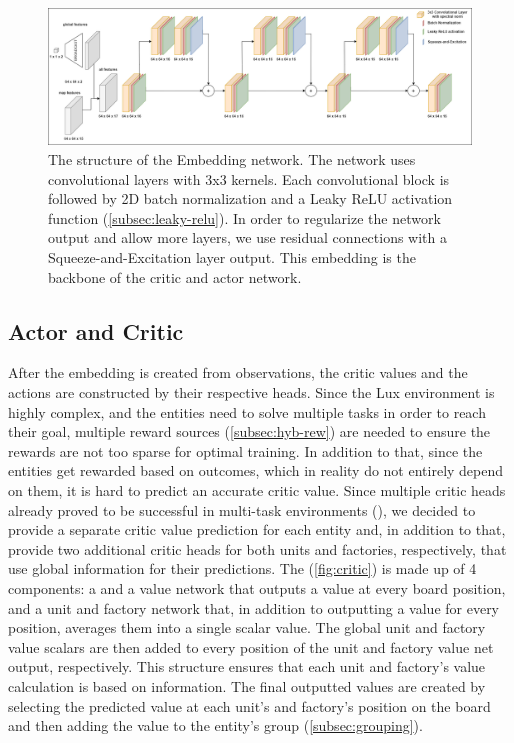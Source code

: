 \begin{figure}[htbp]
    \centering
    \includegraphics[width=1\linewidth]{images/methods_hybrid/feature_extractor/embedding.png}
    \captionsetup{justification=justified, singlelinecheck=false, width=1\linewidth, labelfont=bf} 
    \caption[]{The structure of the Embedding network. The network uses convolutional layers with 3x3 kernels. Each convolutional block is followed by 2D batch normalization and a Leaky ReLU activation function (\autoref{subsec:leaky-relu}). In order to regularize the network output and allow more layers, we use residual connections with a Squeeze-and-Excitation layer output. This embedding is the backbone of the critic and actor network.}
    \label{fig:embedding}
\end{figure}

\subsection{Actor and Critic}
\label{sec:hybrid-network-actor-critic}

\noindent After the embedding is created from observations, the critic values and the actions are constructed by their respective heads. Since the Lux environment is highly complex, and the entities need to solve multiple tasks in order to reach their goal, multiple reward sources (\autoref{subsec:hyb-rew}) are needed to ensure the rewards are not too sparse for optimal training. In addition to that, since the entities get rewarded based on outcomes, which in reality do not entirely depend on them, it is hard to predict an accurate critic value. Since multiple critic heads already proved to be successful in multi-task environments (\cite{mysore2022multicritic}), we decided to provide a separate critic value prediction for each entity and, in addition to that, provide two additional critic heads for both units and factories, respectively, that use global information for their predictions. The  (\autoref{fig:critic}) is made up of 4 components: a  and a  value network that outputs a value at every board position, and a unit and factory  network that, in addition to outputting a value for every position, averages them into a single scalar value. The global unit and factory value scalars are then added to every position of the unit and factory value net output, respectively. This structure ensures that each unit and factory's value calculation is based on  information. The final outputted values are created by selecting the predicted value at each unit's and factory's position on the board and then adding the value to the entity's group (\autoref{subsec:grouping}).

